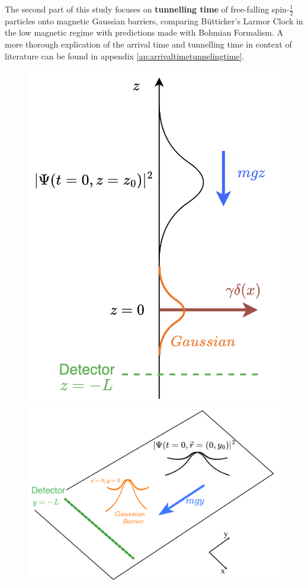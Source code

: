 The second part of this study focuses on \textbf{tunnelling time} of free-falling spin-$\frac{1}{2}$ particles onto magnetic Gaussian barriers, comparing Bütticker's Larmor Clock in the low magnetic regime with predictions made with Bohmian Formalism. A more thorough explication of the arrival time and tunnelling time in context of literature can be found in appendix \ref{ap:arrivaltimetunnelingtime}.
\begin{figure}
    \centering
    \includegraphics[width=\linewidth]{Figures/1d_setup_barrier.png}
    \includegraphics[width=1\linewidth]{Figures/2d_setup_barrier.png}

\end{figure}
